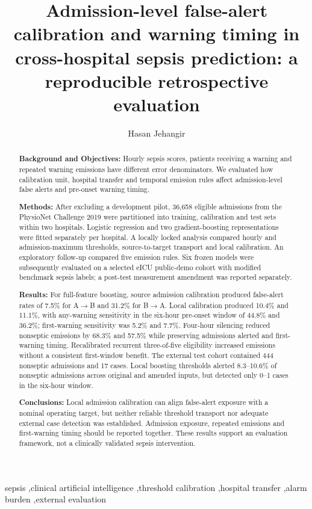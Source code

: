 \documentclass[preprint,12pt]{elsarticle}
\begin{document}
\begin{frontmatter}
\title{Admission-level false-alert calibration and warning timing in cross-hospital sepsis prediction: a reproducible retrospective evaluation}
\author{Hasan Jehangir}
\address{Independent researcher, Pakistan}
\begin{abstract}
\begin{singlespace}
\textbf{Background and Objectives:} Hourly sepsis scores, patients receiving a warning and repeated warning emissions have different error denominators. We evaluated how calibration unit, hospital transfer and temporal emission rules affect admission-level false alerts and pre-onset warning timing.

\textbf{Methods:} After excluding a development pilot, 36,658 eligible admissions from the PhysioNet Challenge 2019 were partitioned into training, calibration and test sets within two hospitals. Logistic regression and two gradient-boosting representations were fitted separately per hospital. A locally locked analysis compared hourly and admission-maximum thresholds, source-to-target transport and local calibration. An exploratory follow-up compared five emission rules. Six frozen models were subsequently evaluated on a selected eICU public-demo cohort with modified benchmark sepsis labels; a post-test measurement amendment was reported separately.

\textbf{Results:} For full-feature boosting, source admission calibration produced false-alert rates of 7.5\% for A$\to$B and 31.2\% for B$\to$A. Local calibration produced 10.4\% and 11.1\%, with any-warning sensitivity in the six-hour pre-onset window of 44.8\% and 36.2\%; first-warning sensitivity was 5.2\% and 7.7\%. Four-hour silencing reduced nonseptic emissions by 68.3\% and 57.5\% while preserving admissions alerted and first-warning timing. Recalibrated recurrent three-of-five eligibility increased emissions without a consistent first-window benefit. The external test cohort contained 444 nonseptic admissions and 17 cases. Local boosting thresholds alerted 8.3--10.6\% of nonseptic admissions across original and amended inputs, but detected only 0--1 cases in the six-hour window.

\textbf{Conclusions:} Local admission calibration can align false-alert exposure with a nominal operating target, but neither reliable threshold transport nor adequate external case detection was established. Admission exposure, repeated emissions and first-warning timing should be reported together. These results support an evaluation framework, not a clinically validated sepsis intervention.
\end{singlespace}
\end{abstract}
\begin{keyword}
sepsis \sep clinical artificial intelligence \sep threshold calibration \sep hospital transfer \sep alarm burden \sep external evaluation
\end{keyword}
\end{frontmatter}
\end{document}
